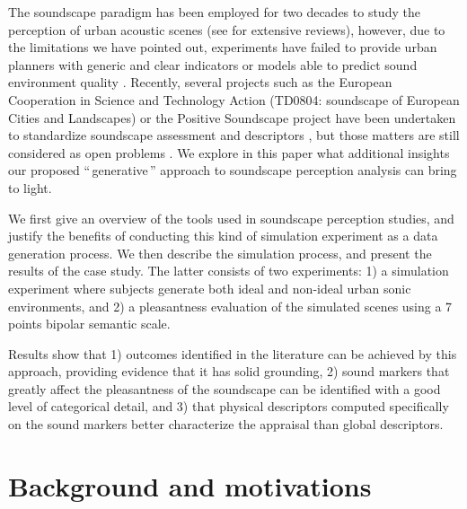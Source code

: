 \documentclass[twoside,twocolumn]{article}
\begin{document}
The soundscape paradigm has been employed for two decades to study the perception of urban acoustic scenes (see \cite{kang2006urban,dubois2006cognitive,aletta2016soundscape} for extensive reviews), however, due to the limitations we have pointed out, experiments have failed to provide  urban planners with generic and clear indicators or models able to predict sound environment quality \cite{schulte-fortkamp_soundscape:_2007, aletta2016soundscape}. Recently, several projects such as the European Cooperation in Science and Technology Action (TD0804: soundscape of European Cities and Landscapes) or the Positive Soundscape project \cite{davies_perception_2013} have been undertaken to standardize soundscape assessment and descriptors \cite{schulte2013soundscape}, but those matters are still considered as open problems \cite{ribeiro2013heart}. We explore in this paper what additional insights our proposed ``\,generative\,'' approach to soundscape perception analysis can bring to light.

We first give an overview of the tools used in soundscape perception studies, and justify the benefits of conducting this kind of simulation experiment as a data generation process. We then describe the simulation process, and present the results of the case study. The latter consists of two experiments: 1) a simulation experiment where subjects generate both ideal and non-ideal urban sonic environments, and 2) a pleasantness evaluation of the simulated scenes using a 7 points bipolar semantic scale. 

Results show that  1) outcomes identified in the literature \cite{guastavino_categorization_2007} can be achieved by this approach, providing evidence that it has solid grounding, 2) sound markers that greatly affect the pleasantness of the soundscape can be identified with a good level of categorical detail, and 3) that physical descriptors computed specifically on the sound markers better characterize the appraisal than global descriptors.

\section{Background and motivations}
\label{statoftheart}
\end{document}
